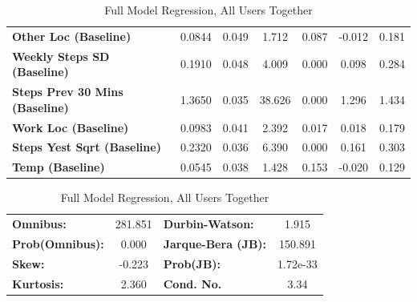\begin{table}
\begin{tabular}{lcccccc}
\textbf{Other Loc (Baseline)}          &       0.0844  &        0.049     &     1.712  &         0.087        &       -0.012    &        0.181     \\
\textbf{Weekly Steps SD (Baseline)}    &       0.1910  &        0.048     &     4.009  &         0.000        &        0.098    &        0.284     \\
\textbf{Steps Prev 30 Mins (Baseline)} &       1.3650  &        0.035     &    38.626  &         0.000        &        1.296    &        1.434     \\
\textbf{Work Loc (Baseline)}           &       0.0983  &        0.041     &     2.392  &         0.017        &        0.018    &        0.179     \\
\textbf{Steps Yest Sqrt (Baseline)}    &       0.2320  &        0.036     &     6.390  &         0.000        &        0.161    &        0.303     \\
\textbf{Temp (Baseline)}               &       0.0545  &        0.038     &     1.428  &         0.153        &       -0.020    &        0.129     \\
\bottomrule
\end{tabular}
\begin{tabular}{lclc}
\textbf{Omnibus:}       & 281.851 & \textbf{  Durbin-Watson:     } &    1.915  \\
\textbf{Prob(Omnibus):} &   0.000 & \textbf{  Jarque-Bera (JB):  } &  150.891  \\
\textbf{Skew:}          &  -0.223 & \textbf{  Prob(JB):          } & 1.72e-33  \\
\textbf{Kurtosis:}      &   2.360 & \textbf{  Cond. No.          } &     3.34  \\
\bottomrule
\end{tabular}
\caption{Full Model Regression, All Users Together}
\end{table}

\medskip

